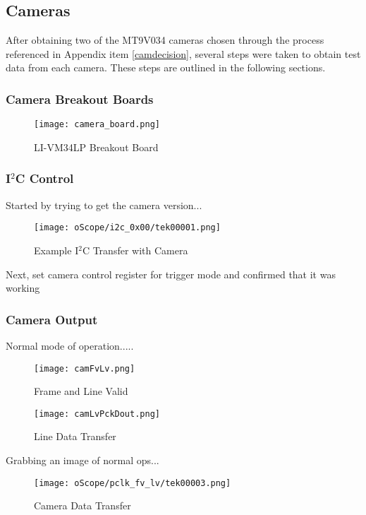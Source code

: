 \subsection{Cameras}
After obtaining two of the MT9V034 cameras chosen through the process referenced in Appendix item \ref{camdecision}, several steps were taken to obtain test data from each camera. These steps are outlined in the following sections.

\subsubsection{Camera Breakout Boards}
\begin{figure}[H]
	\centerline{\texttt{[image: camera\_board.png]}}
	\caption{LI-VM34LP Breakout Board}
	\label{camBreakoutBoard}
\end{figure}

\subsubsection{I$^2$C Control} 
Started by trying to get the camera version...
\begin{figure}[H]
	\centerline{\texttt{[image: oScope/i2c\_0x00/tek00001.png]}}
	\caption{Example I$^2$C Transfer with Camera}
	\label{camVersion}
\end{figure}

\par
Next, set camera control register for trigger mode and confirmed that it was working


\subsubsection{Camera Output}

Normal mode of operation.....
\begin{figure}[H]
	\centerline{\texttt{[image: camFvLv.png]}}
	\caption{Frame and Line Valid}
	\label{FvLv}
\end{figure}
\begin{figure}[H]
	\centerline{\texttt{[image: camLvPckDout.png]}}
	\caption{Line Data Transfer}
	\label{LvDout}
\end{figure}

\par
Grabbing an image of normal ops...
\begin{figure}[H]
	\centerline{\texttt{[image: oScope/pclk\_fv\_lv/tek00003.png]}}
	\caption{Camera Data Transfer}
	\label{camDataTransfer}
\end{figure}

